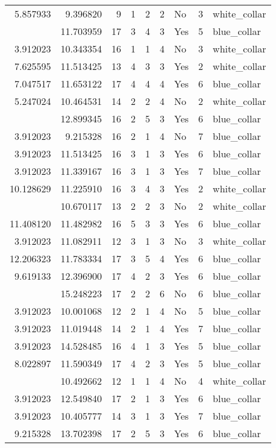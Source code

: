 \documentclass[
]{article}
\begin{document}
\begin{longtable}[t]{rrrrrllrl}
5.857933 & 9.396820 & 9 & 1 & 2 & 2 & No & 3 & white\_collar\\
\addlinespace
10.933999 & 11.703959 & 17 & 3 & 4 & 3 & Yes & 5 & blue\_collar\\
3.912023 & 10.343354 & 16 & 1 & 1 & 4 & No & 3 & white\_collar\\
7.625595 & 11.513425 & 13 & 4 & 3 & 3 & Yes & 2 & white\_collar\\
7.047517 & 11.653122 & 17 & 4 & 4 & 4 & Yes & 6 & blue\_collar\\
5.247024 & 10.464531 & 14 & 2 & 2 & 4 & No & 2 & white\_collar\\
\addlinespace
10.758966 & 12.899345 & 16 & 2 & 5 & 3 & Yes & 6 & blue\_collar\\
3.912023 & 9.215328 & 16 & 2 & 1 & 4 & No & 7 & blue\_collar\\
3.912023 & 11.513425 & 16 & 3 & 1 & 3 & Yes & 6 & blue\_collar\\
3.912023 & 11.339167 & 16 & 3 & 1 & 3 & Yes & 7 & blue\_collar\\
10.128629 & 11.225910 & 16 & 3 & 4 & 3 & Yes & 2 & white\_collar\\
\addlinespace
4.605170 & 10.670117 & 13 & 2 & 2 & 3 & No & 2 & white\_collar\\
11.408120 & 11.482982 & 16 & 5 & 3 & 3 & Yes & 6 & blue\_collar\\
3.912023 & 11.082911 & 12 & 3 & 1 & 3 & No & 3 & white\_collar\\
12.206323 & 11.783334 & 17 & 3 & 5 & 4 & Yes & 6 & blue\_collar\\
9.619133 & 12.396900 & 17 & 4 & 2 & 3 & Yes & 6 & blue\_collar\\
\addlinespace
11.472624 & 15.248223 & 17 & 2 & 2 & 6 & No & 6 & blue\_collar\\
3.912023 & 10.001068 & 12 & 2 & 1 & 4 & No & 5 & blue\_collar\\
3.912023 & 11.019448 & 14 & 2 & 1 & 4 & Yes & 7 & blue\_collar\\
3.912023 & 14.528485 & 16 & 4 & 1 & 3 & Yes & 5 & blue\_collar\\
8.022897 & 11.590349 & 17 & 4 & 2 & 3 & Yes & 5 & blue\_collar\\
\addlinespace
3.912023 & 10.492662 & 12 & 1 & 1 & 4 & No & 4 & white\_collar\\
3.912023 & 12.549840 & 17 & 2 & 1 & 3 & Yes & 6 & blue\_collar\\
3.912023 & 10.405777 & 14 & 3 & 1 & 3 & Yes & 7 & blue\_collar\\
9.215328 & 13.702398 & 17 & 2 & 5 & 3 & Yes & 6 & blue\_collar\\

\end{longtable}
\end{document}
